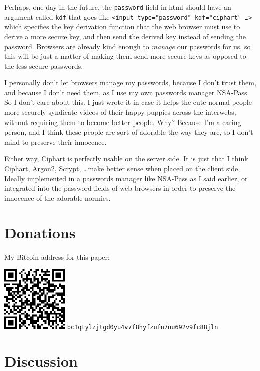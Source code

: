 \documentclass[twocolumn]{article}
\begin{document}
Perhaps, one day in the future, the \texttt{password} field in \gls{html}
should have an argument called \texttt{kdf} that goes like \texttt{<input
type="password" kdf="ciphart" \ldots>} which specifies the key derivation
function that the web browser must use to derive a more secure key, and
then send the derived key instead of sending the password.  Browsers are
already kind enough to \emph{manage} our passwords for us, so this will be
just a matter of making them send more secure keys as opposed to the less
secure passwords.

I personally don't let browsers manage my passwords, because I don't trust
them, and because I don't need them, as I use my own passwords manager
NSA-Pass.  So I don't care about this.  I just wrote it in case it
helps the cute normal people more securely syndicate videos of their happy
puppies across the interwebs, without requiring them to become better
people.  Why?  Because I'm a caring person, and I think these people are
sort of adorable the way they are, so I don't mind to preserve their
innocence.

Either  way, Ciphart is perfectly usable on the server side.  It is
just that I think Ciphart, Argon2, Scrypt, \ldots make
better sense when placed on the client side.  Ideally implemented in a
passwords manager like NSA-Pass as I said earlier, or integrated into
the password fields of web browsers in order to preserve the innocence of
the adorable normies.

\vfill
\break
\appendix
\section{Donations}
My Bitcoin address for this paper:
\begin{center}
    \includegraphics[width=121px]{./pics/btc_wallet_address_trimmed.png}
    \texttt{bc1qtylzjtgd0yu4v7f8hyfzufn7nu692v9fc88jln}
\end{center}

\section{Discussion}
\end{document}
